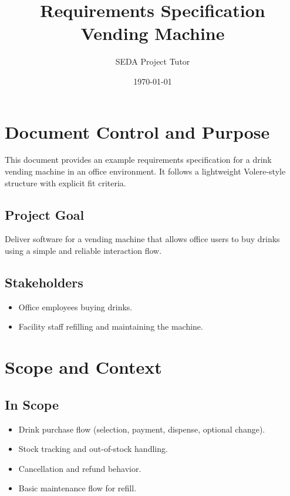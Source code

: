 \documentclass[a4paper,12pt]{article}
\title{Requirements Specification\\[0.5em]\large Vending Machine}
\author{SEDA Project Tutor}
\date{\today}
\begin{document}
    \maketitle
    \tableofcontents
    \newpage


    \section{Document Control and Purpose}
    This document provides an example requirements specification for a drink vending machine in an office environment.
    It follows a lightweight Volere-style structure with explicit fit criteria.

    \subsection{Project Goal}
    Deliver software for a vending machine that allows office users to buy drinks using a simple and reliable interaction flow.

    \subsection{Stakeholders}
    \begin{itemize}[itemsep=0pt,topsep=0pt,parsep=0pt,partopsep=0pt]
        \item Office employees buying drinks.
        \item Facility staff refilling and maintaining the machine.
    \end{itemize}


    \section{Scope and Context}

    \subsection{In Scope}
    \begin{itemize}[itemsep=0pt,topsep=0pt,parsep=0pt,partopsep=0pt]
        \item Drink purchase flow (selection, payment, dispense, optional change).
        \item Stock tracking and out-of-stock handling.
        \item Cancellation and refund behavior.
        \item Basic maintenance flow for refill.
    \end{itemize}
\end{document}
